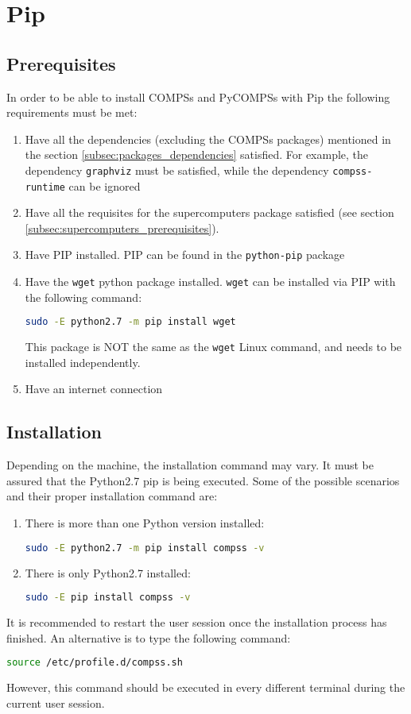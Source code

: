\section{Pip}
\label{sec:Pip}

\subsection{Prerequisites}
\label{subsec:pip_prerequisites}
In order to be able to install COMPSs and PyCOMPSs with Pip the following requirements must be met:
\begin{enumerate}
 \item Have all the dependencies (excluding the COMPSs packages) mentioned in the section \ref{subsec:packages_dependencies} satisfied. For example, the dependency \verb|graphviz|
 must be satisfied, while the dependency \verb|compss-runtime| can be ignored
 \item Have all the requisites for the supercomputers package satisfied (see section \ref{subsec:supercomputers_prerequisites}).
 \item Have PIP installed. PIP can be found in the \verb|python-pip| package
 \item Have the \verb|wget| python package installed. \verb|wget| can be installed via PIP with the following command:
 \begin{lstlisting}[language=bash]
 sudo -E python2.7 -m pip install wget\end{lstlisting}
 This package is NOT  the same as the \verb|wget| Linux command, and needs to be installed independently.
 \item Have an internet connection
\end{enumerate}
\subsection{Installation}
\label{subsec:pip_installation}
Depending on the machine, the installation command may vary. It must be assured that the Python2.7 pip is being executed. Some of the possible scenarios and their proper installation command are:
\begin{enumerate}
 \item There is more than one Python version installed:
 \begin{lstlisting}[language=bash]
 sudo -E python2.7 -m pip install compss -v\end{lstlisting}
 \item There is only Python2.7 installed:
 \begin{lstlisting}[language=bash]
 sudo -E pip install compss -v \end{lstlisting}
\end{enumerate}
It is recommended to restart the user session once the installation process has finished. An alternative is to type the following command:
\begin{lstlisting}[language=bash]
source /etc/profile.d/compss.sh\end{lstlisting}
However, this command should be executed in every different terminal during the current user session.

